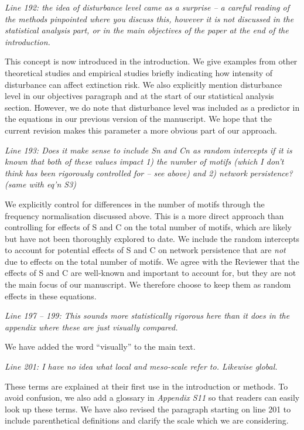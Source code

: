\documentclass[12pt]{article}
\newcommand{\us}{\rm \setlength{\leftskip}{0.3cm} \setlength{\rightskip}{0.3cm}}
\newcommand{\them}{\it \setlength{\leftskip}{0cm} \setlength{\rightskip}{0cm}}
\begin{document}
        \them
        Line 192: the idea of disturbance level came as a surprise – a careful reading of the methods pinpointed where you discuss this, however it is not discussed in the statistical analysis part, or in the main objectives of the paper at the end of the introduction.
        
        \us This concept is now introduced in the introduction. We give examples from other theoretical studies and empirical studies briefly indicating how intensity of disturbance can affect extinction risk. We also explicitly mention disturbance level in our objectives paragraph and at the start of our statistical analysis section. However, we do note that disturbance level was included as a predictor in the equations in our previous version of the manuscript. We hope that the current revision makes this parameter a more obvious part of our approach.
        
        \them
        Line 193: Does it make sense to include Sn and Cn as random intercepts if it is known that both of these values impact 1) the number of motifs (which I don't think has been rigorously controlled for – see above) and 2) network persistence? (same with eq'n S3)
        
        \us
        We explicitly control for differences in the number of motifs through the frequency normalisation discussed above. This is a more direct approach than controlling for effects of S and C on the total number of motifs, which are likely but have not been thoroughly explored to date. We include the random intercepts to account for potential effects of S and C on network persistence that are \emph{not} due to effects on the total number of motifs. We agree with the Reviewer that the effects of S and C are well-known and important to account for, but they are not the main focus of our manuscript. We therefore choose to keep them as random effects in these equations.
        
        
        \them
        Line 197 – 199: This sounds more statistically rigorous here than it does in the appendix where these are just visually compared.
        
        \us We have added the word ``visually'' to the main text.
        
        \them
        Line 201: I have no idea what local and meso-scale refer to. Likewise global.
        
        \us These terms are explained at their first use in the introduction or methods. To avoid confusion, we also add a glossary in \emph{Appendix S11} so that readers can easily look up these terms. We have also revised the paragraph starting on line 201 to include parenthetical definitions and clarify the scale which we are considering.
        
\end{document}
